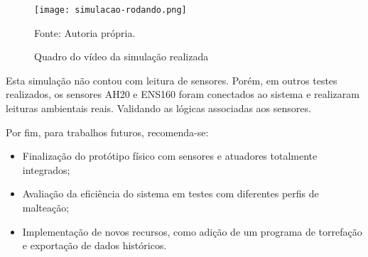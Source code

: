 \begin{figure}[H]
    \centering
    \caption{Quadro do vídeo da simulação realizada}
    \label{fig:simulacaorodando}
    \texttt{[image: simulacao-rodando.png]}

    {\centering\footnotesize Fonte: Autoria própria.\par}
\end{figure}

Esta simulação não contou com leitura de sensores. Porém, em outros testes realizados, os sensores AH20 e ENS160 foram conectados ao sistema e realizaram leituras ambientais reais. Validando as lógicas associadas aos sensores.

Por fim, para trabalhos futuros, recomenda-se:
  
  \begin{itemize}
      \item Finalização do protótipo físico com sensores e atuadores totalmente integrados;
      \item Avaliação da eficiência do sistema em testes com diferentes perfis de malteação;
      \item Implementação de novos recursos, como adição de um programa de torrefação e exportação de dados históricos.
  \end{itemize}